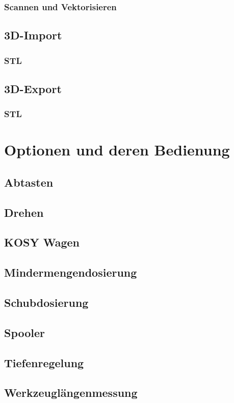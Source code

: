 \documentclass[14pt,a4paper]{book}
\begin{document}
		\subsection{Scannen und Vektorisieren} 
	\section{3D-Import} 
		\subsection{STL}
	\section{3D-Export} 
		\subsection{STL}

\chapter{Optionen und deren Bedienung} 
	\section{Abtasten}
	\section{Drehen} 
	\section{KOSY Wagen} 
	\section{Mindermengendosierung} 
	\section{Schubdosierung} 
	\section{Spooler} 
	\section{Tiefenregelung} 
	\section{Werkzeuglängenmessung} 
\end{document}
